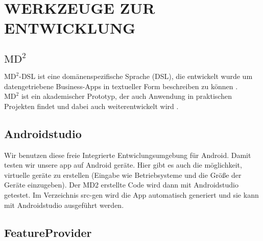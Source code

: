 \section{\uppercase{Werkzeuge zur Entwicklung}}
	
	\subsection{$\text{MD}^2$}
	$\text{MD}^2$-DSL ist eine dom\"anenspezifische Sprache (DSL), die entwickelt wurde um datengetriebene Business-Apps in textueller Form beschreiben zu k\"onnen \cite{DSLMD2_2013}.\\
	$\text{MD}^2$ ist ein akademischer Prototyp, der auch Anwendung in praktischen Projekten findet und dabei auch weiterentwickelt wird \cite{MDCP2015}.
	
	\subsection{Androidstudio}
Wir benutzen diese freie Integrierte Entwiclungsumgebung f\"ur Android. Damit testen wir unsere app auf Android geräte. Hier gibt es auch die m\"oglichkeit, virtuelle ger\"ate zu erstellen (Eingabe wie Betriebsysteme und die Gr\"o{\ss}e der Ger\"ate einzugeben).
Der MD2 erstellte Code wird dann mit Androidstudio getestet. Im Verzeichnis src-gen wird die App automatisch generiert und sie kann mit Androidstudio ausgef\"uhrt werden.

	\subsection{FeatureProvider}
	
